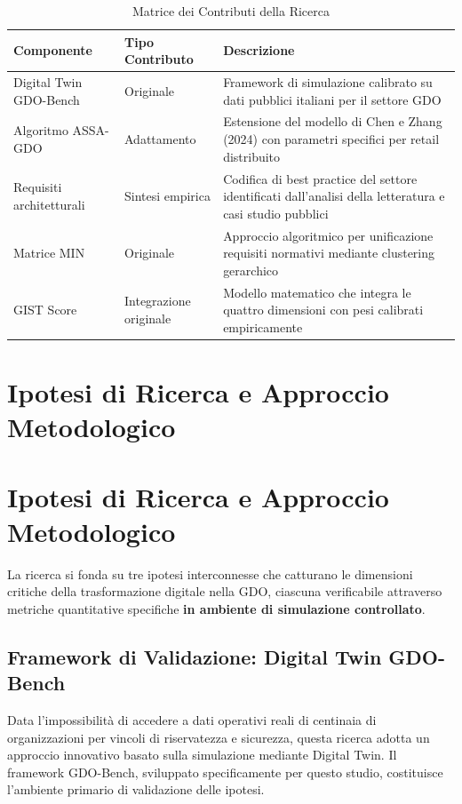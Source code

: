 \begin{table}[h!]
\centering
\caption{Matrice dei Contributi della Ricerca}
\begin{tabular}{|p{3.5cm}|p{3cm}|p{7cm}|}
\hline
\textbf{Componente} & \textbf{Tipo Contributo} & \textbf{Descrizione} \\
\hline
Digital Twin GDO-Bench & Originale & Framework di simulazione calibrato su dati pubblici italiani per il settore GDO \\
\hline
Algoritmo ASSA-GDO & Adattamento & Estensione del modello di Chen e Zhang (2024) con parametri specifici per retail distribuito \\
\hline
Requisiti architetturali & Sintesi empirica & Codifica di best practice del settore identificati dall'analisi della letteratura e casi studio pubblici \\
\hline
Matrice MIN & Originale & Approccio algoritmico per unificazione requisiti normativi mediante clustering gerarchico \\
\hline
GIST Score & Integrazione originale & Modello matematico che integra le quattro dimensioni con pesi calibrati empiricamente \\
\hline
\end{tabular}
\end{table}



\section{\texorpdfstring{Ipotesi di Ricerca e Approccio Metodologico}{1.4 - Ipotesi di Ricerca e Approccio Metodologico}}
\label{sec:ipotesi_metodologia}
\section{Ipotesi di Ricerca e Approccio Metodologico}

La ricerca si fonda su tre ipotesi interconnesse che catturano le dimensioni critiche della trasformazione digitale nella GDO, ciascuna verificabile attraverso metriche quantitative specifiche \textbf{in ambiente di simulazione controllato}.

\subsection{Framework di Validazione: Digital Twin GDO-Bench}

Data l'impossibilità di accedere a dati operativi reali di centinaia di organizzazioni per vincoli di riservatezza e sicurezza, questa ricerca adotta un approccio innovativo basato sulla simulazione mediante Digital Twin. Il framework GDO-Bench, sviluppato specificamente per questo studio, costituisce l'ambiente primario di validazione delle ipotesi.


